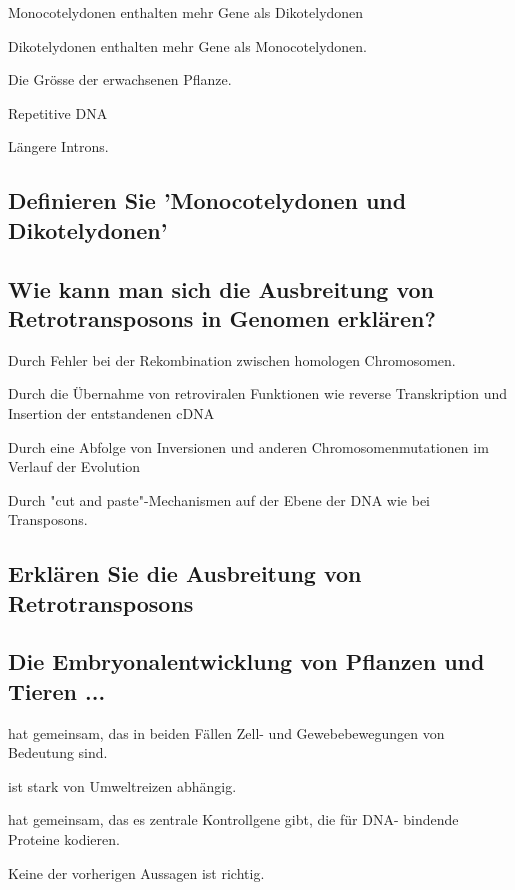 \documentclass{article}
\begin{document}
\begin{todolist}%
\item Monocotelydonen enthalten mehr Gene als Dikotelydonen  
\item Dikotelydonen enthalten mehr Gene als Monocotelydonen.  
\item Die Grösse der erwachsenen Pflanze.  
\item Repetitive DNA
\item Längere Introns.  
\end{todolist}
\subsection*{Definieren Sie 'Monocotelydonen und Dikotelydonen'}
\bigskip\bigskip\bigskip\bigskip\bigskip\bigskip


\subsection*{Wie kann man sich die Ausbreitung von Retrotransposons in Genomen
erklären?}
\begin{todolist}%
\item Durch Fehler bei der Rekombination zwischen homologen
Chromosomen.  
\item Durch die Übernahme von retroviralen Funktionen wie reverse
Transkription und Insertion der entstandenen cDNA
\item Durch eine Abfolge von Inversionen und anderen
Chromosomenmutationen im Verlauf der Evolution  
\item Durch "cut and paste"-Mechanismen auf der Ebene der DNA wie bei
Transposons.  
\end{todolist}

\subsection*{Erklären Sie die Ausbreitung von Retrotransposons}
\bigskip\bigskip\bigskip\bigskip\bigskip\bigskip



\subsection*{Die Embryonalentwicklung von Pflanzen und Tieren ...}
\begin{todolist}%
\item hat gemeinsam, das in beiden Fällen Zell- und Gewebebewegungen 
von Bedeutung sind.  
\item ist stark von Umweltreizen abhängig.  
\item hat gemeinsam, das es zentrale Kontrollgene gibt, die für DNA-
bindende Proteine kodieren.  
\item Keine der vorherigen Aussagen ist richtig.  
\end{todolist}
\end{document}
